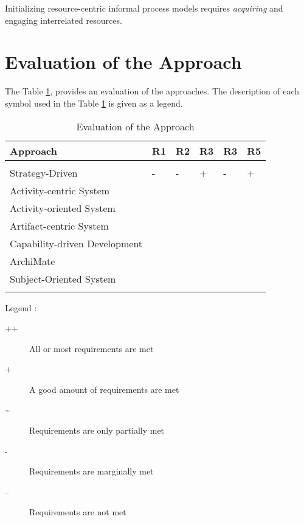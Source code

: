   


Initializing resource-centric informal process models requires \textit{acquiring} and engaging interrelated resources.

\section{Evaluation of the Approach}
\label{sec:evaluationoftheapproach}

The Table \ref{tab:evaluationoftheapproach}, provides an evaluation of the approaches. The description of each symbol used in the  Table \ref{tab:evaluationoftheapproach} is given as a legend.


\begin{center}
	\begin{longtable}{p{5cm}p{2cm}p{2cm}p{2cm}p{2cm}p{2cm}} 
		\toprule 
		\textbf{Approach} & \textbf{R1}  & \textbf{R2}  & \textbf{R3}  & \textbf{R3}  & \textbf{R5} \\
		\midrule
		\endfirsthead
		\\
	   	Strategy-Driven & -  & -  & +  & -  & + \\
	   	Activity-centric System  \\
	   	Activity-oriented System  \\
	   	Artifact-centric System  \\
	   	Capability-driven Development \\
	   	ArchiMate \\
	    Subject-Oriented System \\
		
		\bottomrule
		\caption{Evaluation of the Approach}
		\label{tab:evaluationoftheapproach}
	\end{longtable}	
\end{center}

Legend :
\begin{description}
	\item[++] All or most requirements are met
	\item[+]   A good amount of requirements are met
	\item[\~] Requirements are only partially met
	\item[-]   Requirements are marginally met
	\item[--] Requirements are not met
\end{description}


